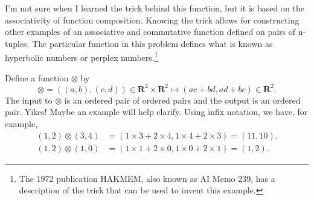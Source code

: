 \documentclass[12pt,fleqn,answers]{exam}
\newcommand{\reals}{\mathbf{R}}
\begin{document}
I'm not sure when I learned the trick behind this function, but it is based on the associativity of function composition. Knowing 
the trick allows for constructing other examples of an associative and commutative function defined on pairs of n-tuples.  The particular
function in this problem defines what is known as hyperbolic numbers or perplex numbers.\footnote{The 1972 publication HAKMEM, also known as AI Memo 239, 
has a description of the trick that can be used to invent this example.}

\vspace{0.1in}


\begin{questions} 

\question Define a function $\otimes$ by
\begin{equation*}
   \otimes = \left  ((a,b), (c,d) \right) \in \reals^2 \times \reals^2  \mapsto
      (ac + bd, ad + bc) \in \reals^2.
\end{equation*}
The input to  $\otimes$  is an ordered pair of ordered pairs and the output is an ordered pair. Yikes!  Maybe an example
will help clarify.  Using infix notation, we have, for example,
\begin{align*}
  (1,2) \otimes (3,4) &= (1 \times 3 + 2 \times 4, 1 \times 4 + 2 \times 3)
                       = (11,10). \\
  (1,2) \otimes (1,0) &= (1 \times 1 + 2 \times 0, 1 \times 0 + 2 \times 1)
                       = (1,2).                      
\end{align*}

\end{questions}
\end{document}

